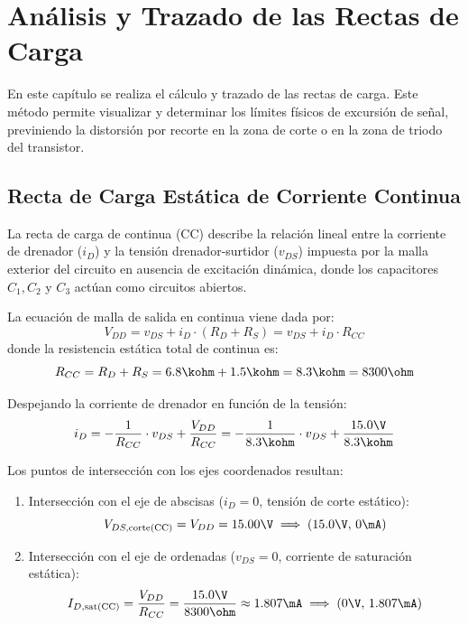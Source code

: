 \chapter{Análisis y Trazado de las Rectas de Carga}
\label{chap:rectas_de_carga}

En este capítulo se realiza el cálculo y trazado de las rectas de carga. Este método permite visualizar y determinar
los límites físicos de excursión de señal, previniendo la distorsión por recorte en la zona de corte o en la zona
de triodo del transistor.

\section{Recta de Carga Estática de Corriente Continua}

La recta de carga de continua (CC) describe la relación lineal entre la corriente de drenador ($i_D$) y la tensión
drenador-surtidor ($v_{DS}$) impuesta por la malla exterior del circuito en ausencia de excitación dinámica, donde los
capacitores $C_1, C_2$ y $C_3$ actúan como circuitos abiertos.

La ecuación de malla de salida en continua viene dada por:
\begin{equation}
  V_{DD} = v_{DS} + i_D \cdot (R_D + R_S) = v_{DS} + i_D \cdot R_{CC}
  \label{eq:malla_salida_cc}
\end{equation}
donde la resistencia estática total de continua es:
\begin{equation}
  R_{CC} = R_D + R_S = 6.8\kohm + 1.5\kohm = 8.3\kohm = 8300\ohm
  \label{eq:Rcc_tp5}
\end{equation}

Despejando la corriente de drenador en función de la tensión:
\begin{equation}
  i_D = -\frac{1}{R_{CC}} \cdot v_{DS} + \frac{V_{DD}}{R_{CC}} = -\frac{1}{8.3\kohm} \cdot v_{DS} + \frac{15.0\V}{8.3\kohm}
  \label{eq:recta_cc_tp5}
\end{equation}

Los puntos de intersección con los ejes coordenados resultan:
\begin{enumerate}
  \item Intersección con el eje de abscisas ($i_D = 0$, tensión de corte estático):
    \begin{equation}
      V_{DS,\mathrm{corte(CC)}} = V_{DD} = 15.00\V \implies (15.0\V,\, 0\mA)
    \end{equation}
  \item Intersección con el eje de ordenadas ($v_{DS} = 0$, corriente de saturación estática):
    \begin{equation}
      I_{D,\mathrm{sat(CC)}} = \frac{V_{DD}}{R_{CC}} = \frac{15.0\V}{8300\ohm} \approx 1.807\mA \implies (0\V,\, 1.807\mA)
    \end{equation}
\end{enumerate}

